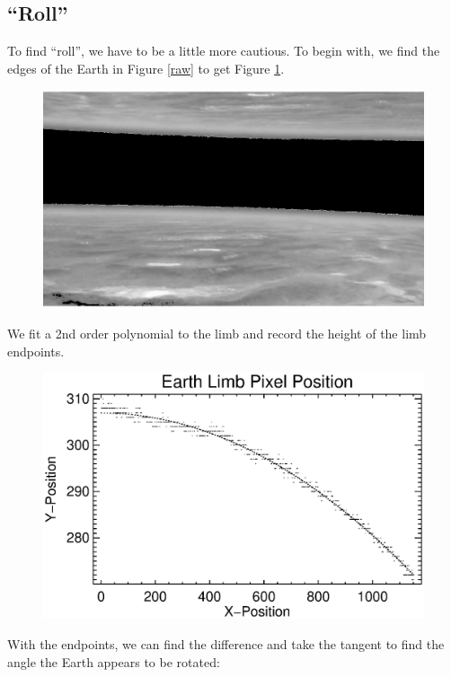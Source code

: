 \documentclass[10pt]{article}
\begin{document}
\subsection{``Roll''} %
\label{sub:roll}

To find ``roll'', we have to be a little more cautious. To begin with, we find the edges of the Earth in Figure \ref{raw} to get Figure \ref{earthlimb}.

\begin{figure}[!h]
    \centering
    \includegraphics[width=.9\textwidth]{plots_tables_images/ama.eps}
    \label{earthlimb}
\end{figure}

We fit a 2nd order polynomial to the limb and record the height of the limb endpoints. 

\begin{figure}[!h]
    \centering
    \includegraphics[width=.9\textwidth]{plots_tables_images/earth_limb.eps}
    \label{limbfit}
\end{figure}

With the endpoints, we can find the difference and take the tangent to find the angle the Earth appears to be rotated:
\end{document}
